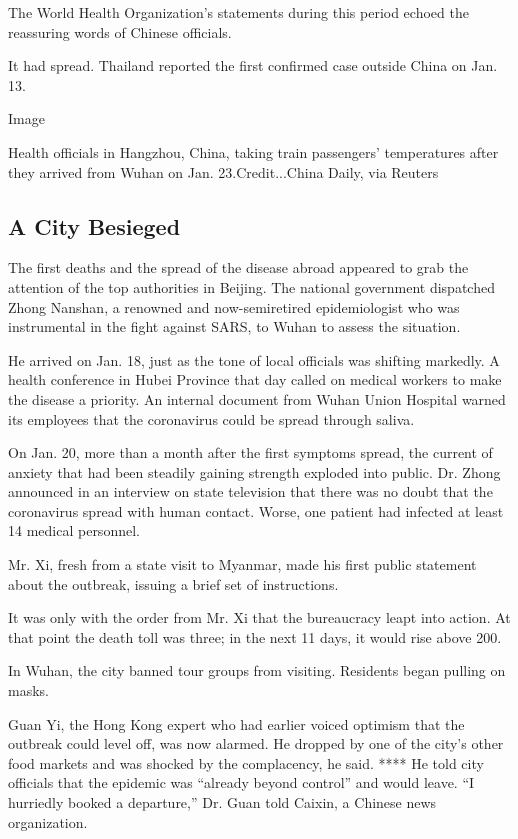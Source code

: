 The World Health Organization's statements during this period echoed the
reassuring words of Chinese officials.

It had spread. Thailand reported the first confirmed case outside China
on Jan. 13.

Image

Health officials in Hangzhou, China, taking train passengers'
temperatures after they arrived from Wuhan on Jan. 23.Credit...China
Daily, via Reuters

\hypertarget{a-city-besieged}{%
\subsection{A City Besieged}\label{a-city-besieged}}

The first deaths and the spread of the disease abroad appeared to grab
the attention of the top authorities in Beijing. The national government
dispatched Zhong Nanshan, a renowned and now-semiretired epidemiologist
who was instrumental in the fight against SARS, to Wuhan to assess the
situation.

He arrived on Jan. 18, just as the tone of local officials was shifting
markedly. A health conference in Hubei Province that day called on
medical workers to make the disease a priority. An internal document
from Wuhan Union Hospital warned its employees that the coronavirus
could be spread through saliva.

On Jan. 20, more than a month after the first symptoms spread, the
current of anxiety that had been steadily gaining strength exploded into
public. Dr. Zhong announced in an interview on state television that
there was no doubt that the coronavirus spread with human contact.
Worse, one patient had infected at least 14 medical personnel.

Mr. Xi, fresh from a state visit to Myanmar, made his first public
statement about the outbreak, issuing a brief set of instructions.

It was only with the order from Mr. Xi that the bureaucracy leapt into
action. At that point the death toll was three; in the next 11 days, it
would rise above 200.

In Wuhan, the city banned tour groups from visiting. Residents began
pulling on masks.

Guan Yi, the Hong Kong expert who had earlier voiced optimism that the
outbreak could level off, was now alarmed. He dropped by one of the
city's other food markets and was shocked by the complacency, he said.
**** He told city officials that the epidemic was ``already beyond
control'' and would leave. ``I hurriedly booked a departure,'' Dr. Guan
told Caixin, a Chinese news organization.

